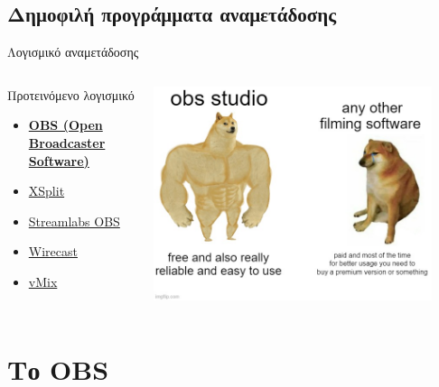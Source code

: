 \documentclass[aspectratio=169]{beamer}
\begin{document}
\subsection{Δημοφιλή προγράμματα αναμετάδοσης}
\begin{frame}{Λογισμικό αναμετάδοσης}
    \begin{columns}
      \begin{column}{0.4\textwidth}
        \begin{exampleblock}{Προτεινόμενο λογισμικό}
        \begin{itemize}
          \item \textbf{\href{https://obsproject.com/}{OBS (Open Broadcaster Software)}}
          \item \href{https://www.xsplit.com/}{XSplit}
          \item \href{https://streamlabs.com/}{Streamlabs OBS}
          \item \href{https://www.telestream.net/wirecast/}{Wirecast}
          \item \href{https://www.vmix.com/}{vMix}
        \end{itemize}
      \end{exampleblock}
      \end{column}
      \begin{column}{0.6\textwidth}
        \begin{center}
          \includegraphics[width=0.9\textwidth]{images/meme.jpg}
        \end{center}
      \end{column}
    \end{columns}
\end{frame}
\section{Το OBS}
\end{document}
